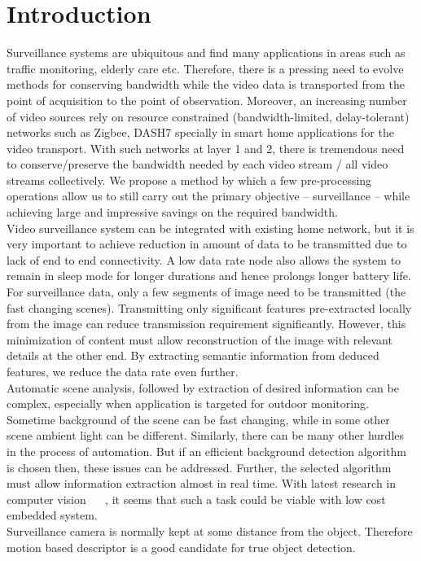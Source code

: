 \documentclass[a4paper, 12pt, twoside]{synopsis}  %
\begin{document}
\section{Introduction}
\indent Surveillance systems are ubiquitous and find many applications
in areas such as traffic monitoring, elderly care etc. Therefore, there
is a pressing need to evolve methods for conserving bandwidth while the
video data is transported from the point of acquisition to the point of
observation. Moreover, an increasing number of video sources rely on
resource constrained (bandwidth-limited, delay-tolerant) networks such
as Zigbee, DASH7 specially in smart home applications for the video
transport. With such networks at layer 1 and 2, there is tremendous need
to conserve/preserve the bandwidth needed by each video stream / all
video streams collectively. We propose a method by which a few
pre-processing operations allow us to still carry out the primary
objective – surveillance – while achieving large and impressive savings
on the required bandwidth.\\
\indent Video surveillance system can be integrated with existing home
network, but it is very important to achieve reduction in amount of
data to be transmitted due to lack of end to end connectivity. A low
data rate node also allows the system to remain in sleep mode for longer
durations and hence prolongs longer battery life.\\
\indent For surveillance data, only a few segments of image need to be
transmitted (the fast changing scenes).  Transmitting only significant
features pre-extracted locally from the image can reduce transmission
requirement significantly. However, this minimization of content must
allow reconstruction of the image with relevant details at the other
end. By extracting semantic information from deduced features, we reduce
the data rate even further. \\
\indent Automatic scene analysis, followed by extraction of desired
information can be complex, especially when application is targeted for
outdoor monitoring.  Sometime background of the scene can be fast
changing, while in some other scene ambient light can be different.
Similarly, there can be many other hurdles in the process of automation.
But if an efficient background detection algorithm is chosen then, these
issues can be addressed. Further, the selected algorithm must allow
information extraction almost in real time. With latest research in
computer vision ~\cite{3} ~\cite{5}, it seems that such a task could be
viable with low cost embedded system.\\
\indent Surveillance camera is normally kept at some distance from the
object. Therefore motion based descriptor is a good candidate for true
object detection.\\
\end{document}
